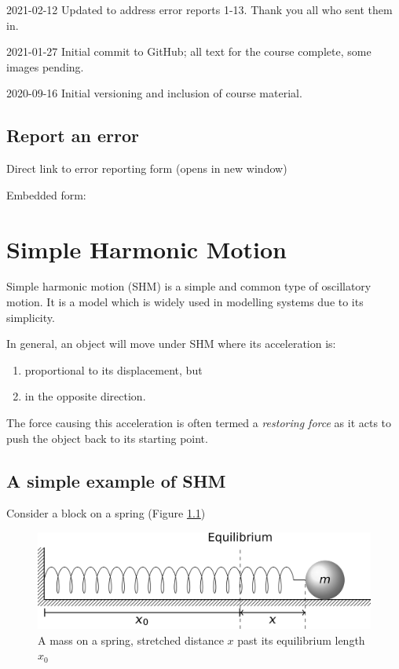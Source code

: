 \documentclass[
]{book}
\providecommand{\tightlist}{%
  \setlength{\itemsep}{0pt}\setlength{\parskip}{0pt}}
\begin{document}
2021-02-12 Updated to address error reports 1-13. Thank you all who sent them in.

2021-01-27 Initial commit to GitHub; all text for the course complete, some images pending.

2020-09-16 Initial versioning and inclusion of course material.

\hypertarget{report-an-error}{%
\section*{Report an error}\label{report-an-error}}

Direct link to error reporting form (opens in new window)

Embedded form:

\hypertarget{sec:shm}{%
\chapter{Simple Harmonic Motion}\label{sec:shm}}

Simple harmonic motion (SHM) is a simple and common type of oscillatory motion. It is a model which is widely used in modelling systems due to its simplicity.

In general, an object will move under SHM where its acceleration is:

\begin{enumerate}
\def\labelenumi{\arabic{enumi}.}
\tightlist
\item
  proportional to its displacement, but
\item
  in the opposite direction.
\end{enumerate}

The force causing this acceleration is often termed a \emph{restoring force} as it acts to push the object back to its starting point.

\hypertarget{sec:ch1-simpleshmexample}{%
\section{A simple example of SHM}\label{sec:ch1-simpleshmexample}}

Consider a block on a spring (Figure \ref{fig:ch1-blockonspring1})

\begin{figure}

{\centering \includegraphics[width=0.7\linewidth]{visualisations/LaTeX/ch1-blockonspring1} 

}

\caption{A mass on a spring, stretched distance $x$ past its equilibrium length $x_0$}\label{fig:ch1-blockonspring1}
\end{figure}
\end{document}
